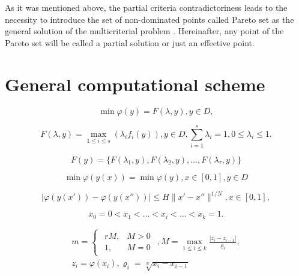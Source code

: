 \documentclass[runningheads]{llncs}
\begin{document}
As it was mentioned above, the partial criteria contradictoriness leads to the necessity to introduce the set of non-dominated points   called Pareto set as the general solution of the multicriterial problem \cite{Miettinen1999,Ehrgott2005,Pardalos2017}. Hereinafter, any point of the Pareto set will be called a partial solution or just an effective point.



\section{General computational scheme}
\label{sec:3}

\begin{equation}
\label{eq:04}
\min \varphi(y) = F( \lambda, y ), y \in D,
\end{equation}


\begin{equation}
\label{eq:05}
F(\lambda, y) = \max_{1 \leq i \leq s} {(\lambda_i f_i (y))}, y \in D, \sum_{i=1}^s {\lambda_i} = 1, 0 \leq \lambda_i \leq 1.
\end{equation}


\begin{equation}
\label{eq:06}
F(y) = \{ F(\lambda_1,y),F(\lambda_2,y), \dots ,F(\lambda_\tau,y)\}
\end{equation}


\begin{equation}
\label{eq:07}
\min{\varphi(y(x))} = \min {\varphi(y)}, x \in [0,1], y \in D
\end{equation}


\begin{equation}
\label{eq:08}
|\varphi(y(x')) - \varphi(y(x''))| \leq H \|x' - x''\|^{1/N} , x \in [0,1],
\end{equation}


\begin{equation}
    \label{eq:09}
    x_0 = 0 < x_1 < \dots < x_i < \dots < x_{k} = 1.
\end{equation}


\begin{equation}
    \label{eq:10}
		\begin{matrix}
		m=\begin{cases}
				\begin{matrix}
					 r M, & M >0 \\
					 1, & M = 0 
				\end{matrix} 
			\end{cases} ,
		M = \max_{1 \leq i \leq k} \frac{| z_i - z_{i-1}|}{\varrho_i}, \\
		z_i = \varphi( x_i ), \varrho_i=\sqrt[N]{x_i-x_{i-1}}
		\end{matrix}
\end{equation}
\end{document}
